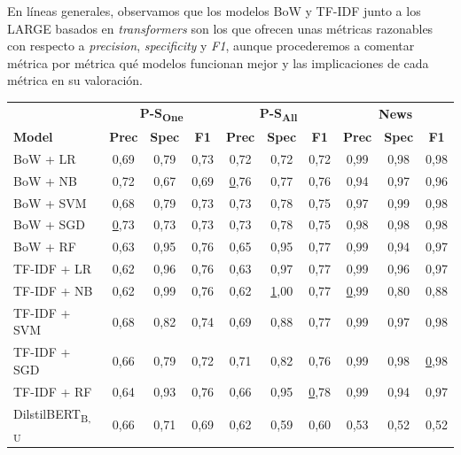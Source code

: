 En líneas generales, observamos que los modelos BoW y TF-IDF junto a los LARGE basados en \textit{transformers} son los que ofrecen unas métricas razonables con respecto a \textit{precision}, \textit{specificity} y \textit{F1}, aunque procederemos a comentar métrica por métrica qué modelos funcionan mejor y las implicaciones de cada métrica en su valoración.

\begin{table}[!h]
    \begin{center}
        \begin{tabular}{lccccccccc}
        \textbf{} & \multicolumn{3}{c}{\textbf{P-S\textsubscript{One}}} & \multicolumn{3}{c}{\textbf{P-S\textsubscript{All}}} & \multicolumn{3}{c}{\textbf{News}} \\
        \textbf{Model} & \footnotesize{\textbf{Prec}} & \footnotesize{\textbf{Spec}} & \footnotesize{\textbf{F1}} & \footnotesize{\textbf{Prec}} & \footnotesize{\textbf{Spec}} & \footnotesize{\textbf{F1}} & \footnotesize{\textbf{Prec}} & \footnotesize{\textbf{Spec}} & \footnotesize{\textbf{F1}} \\ \hline
        {BoW + LR} & 0,69 & 0,79 & 0,73 & 0,72 & 0,72 & 0,72 & 0,99 & 0,98 & 0,98 \\
        {BoW + NB} & 0,72 & 0,67 & 0,69 & {\ul 0,76} & 0,77 & 0,76 & 0,94 & 0,97 & 0,96 \\
        {BoW + SVM} & 0,68 & 0,79 & 0,73 & 0,73 & 0,78 & 0,75 & 0,97 & 0,99 & 0,98 \\
        {BoW + SGD} & {\ul 0,73} & 0,73 & 0,73 & 0,73 & 0,78 & 0,75 & 0,98 & 0,98 & 0,98 \\
        {BoW + RF} & 0,63 & 0,95 & 0,76 & 0,65 & 0,95 & 0,77 & 0,99 & 0,94 & 0,97 \\ \hline
        {TF-IDF + LR} & 0,62 & 0,96 & 0,76 & 0,63 & 0,97 & 0,77 & 0,99 & 0,96 & 0,97 \\
        {TF-IDF + NB} & 0,62 & 0,99 & 0,76 & 0,62 & {\ul 1,00} & 0,77 & {\ul 0,99} & 0,80 & 0,88 \\
        {TF-IDF + SVM} & 0,68 & 0,82 & 0,74 & 0,69 & 0,88 & 0,77 & 0,99 & 0,97 & 0,98 \\
        {TF-IDF + SGD} & 0,66 & 0,79 & 0,72 & 0,71 & 0,82 & 0,76 & 0,99 & 0,98 & {\ul 0,98} \\
        {TF-IDF + RF} & 0,64 & 0,93 & 0,76 & 0,66 & 0,95 & {\ul 0,78} & 0,99 & 0,94 & 0,97 \\ \hline
        {DilstilBERT}\textsubscript{B, U} & 0,66 & 0,71 & 0,69 & 0,62 & 0,59 & 0,60 & 0,53 & 0,52 & 0,52 \\

\end{tabular}
\end{center}
\end{table}
